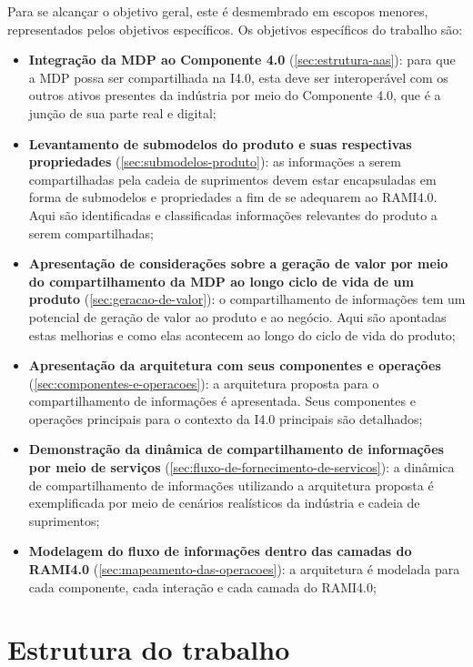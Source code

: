 Para se alcançar o objetivo geral, este é desmembrado em escopos menores, representados pelos objetivos específicos. Os objetivos específicos do trabalho são:

\begin{itemize}
	\item \textbf{Integração da MDP ao Componente 4.0} (\autoref{sec:estrutura-aas}): para que a MDP possa ser compartilhada na I4.0, esta deve ser interoperável com os outros ativos presentes da indústria por meio do Componente 4.0, que é a junção de sua parte real e digital;
	\item \textbf{Levantamento de submodelos do produto e suas respectivas propriedades} (\autoref{sec:submodelos-produto}): as informações a serem compartilhadas pela cadeia de suprimentos devem estar encapsuladas em forma de submodelos e propriedades a fim de se adequarem ao RAMI4.0. Aqui são identificadas e classificadas informações relevantes do produto a serem compartilhadas;
	\item \textbf{Apresentação de considerações sobre a geração de valor por meio do compartilhamento da MDP ao longo ciclo de vida de um produto} (\autoref{sec:geracao-de-valor}): o compartilhamento de informações tem um potencial de geração de valor ao produto e ao negócio. Aqui são apontadas estas melhorias e como elas acontecem ao longo do ciclo de vida do produto;
	\item \textbf{Apresentação da arquitetura com seus componentes e operações} (\autoref{sec:componentes-e-operacoes}): a arquitetura proposta para o compartilhamento de informações é apresentada. Seus componentes e operações principais para o contexto da I4.0 principais são detalhados;
	\item \textbf{Demonstração da dinâmica de compartilhamento de informações por meio de serviços} (\autoref{sec:fluxo-de-fornecimento-de-servicos}): a dinâmica de compartilhamento de informações utilizando a arquitetura proposta é exemplificada por meio de cenários realísticos da indústria e cadeia de suprimentos;
	\item \textbf{Modelagem do fluxo de informações dentro das camadas do RAMI4.0} (\autoref{sec:mapeamento-das-operacoes}): a arquitetura é modelada para cada componente, cada interação e cada camada do RAMI4.0;
\end{itemize}

\section{Estrutura do trabalho}
\label{sec:estrutura}

